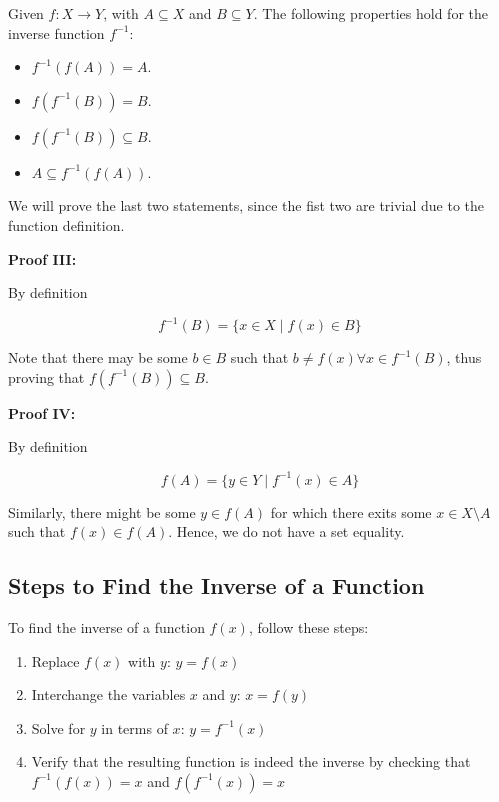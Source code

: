 Given \(f: X \to Y\), with \(A \subseteq X\) and \(B \subseteq Y\). The following properties hold for the inverse function \(f^{-1}\):

\begin{itemize}

	\item \(f^{-1}(f(A)) = A\).

	\item \(f(f^{-1}(B)) = B\).

	\item \(f(f^{-1}(B)) \subseteq B\).

	\item \(A \subseteq f^{-1}(f(A))\).

\end{itemize}

We will prove the last two statements, since the fist two are trivial due to the function definition.

\textbf{Proof III:}

By definition

\[
	f^{-1}(B) = \{x \in X \mid f(x) \in B\}
\]

Note that there may be some \(b \in B\) such that \(b \neq f(x) \forall x \in f^{-1}(B)\), thus proving that
\(f(f^{-1}(B)) \subseteq B\).

\QED

\textbf{Proof IV:}

By definition

\[
	f(A) = \{y \in Y \mid f^{-1}(x) \in A\}
\]

Similarly, there might be some \(y \in f(A)\) for which there exits some \(x \in X \setminus A\) such that \(f(x) \in f(A)\). Hence,
we do not have a set equality.

\QED

\subsection{Steps to Find the Inverse of a Function}

To find the inverse of a function \(f (x)\), follow these steps:

\begin{enumerate}

	\item Replace \(f (x)\) with \(y\): \(y = f (x)\)

	\item Interchange the variables \(x\) and \(y\): \(x = f (y)\)

	\item Solve for \(y\) in terms of \(x\): \(y = f^{-1} (x)\)

	\item Verify that the resulting function is indeed the inverse by checking that \(f^{-1}(f(x)) = x\)
	      and \(f (f^{-1} (x)) = x\)

\end{enumerate}

